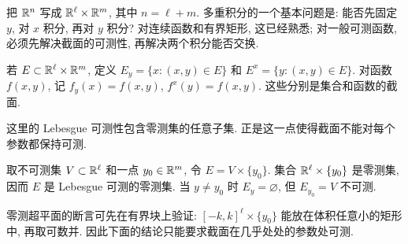 \label{ra:c6}


把 $\mathbb R^n$ 写成 $\mathbb R^\ell\times\mathbb R^m$, 其中 $n=\ell+m$. 多重积分的一个基本问题是: 能否先固定 $y$, 对 $x$ 积分, 再对 $y$ 积分? 对连续函数和有界矩形, 这已经熟悉; 对一般可测函数, 必须先解决截面的可测性, 再解决两个积分能否交换.

\begin{definition}[截面]
若 $E\subset\mathbb R^\ell\times\mathbb R^m$, 定义 $E_y=\{x:(x,y)\in E\}$ 和 $E^x=\{y:(x,y)\in E\}$. 对函数 $f(x,y)$, 记 $f_y(x)=f(x,y)$, $f^x(y)=f(x,y)$. 这些分别是集合和函数的截面.
\end{definition}

这里的 Lebesgue 可测性包含零测集的任意子集. 正是这一点使得截面不能对每个参数都保持可测.

\begin{example}
取不可测集 $V\subset\mathbb R^\ell$ 和一点 $y_0\in\mathbb R^m$, 令 $E=V\times\{y_0\}$. 集合 $\mathbb R^\ell\times\{y_0\}$ 是零测集, 因而 $E$ 是 Lebesgue 可测的零测集. 当 $y\ne y_0$ 时 $E_y=\varnothing$, 但 $E_{y_0}=V$ 不可测.
\end{example}

零测超平面的断言可先在有界块上验证: $[-k,k]^\ell\times\{y_0\}$ 能放在体积任意小的矩形中, 再取可数并. 因此下面的结论只能要求截面在几乎处处的参数处可测.

